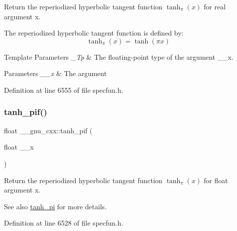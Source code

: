 Return the reperiodized hyperbolic tangent function $ \tanh_\pi(x) $ for real argument {\ttfamily x}.

The reperiodized hyperbolic tangent function is defined by\+: \[ \tanh_\pi(x) = \tanh(\pi x) \]


\begin{DoxyTemplParams}{Template Parameters}
{\em \+\_\+\+Tp} & The floating-\/point type of the argument {\ttfamily \+\_\+\+\_\+x}. \\
\hline
\end{DoxyTemplParams}

\begin{DoxyParams}{Parameters}
{\em \+\_\+\+\_\+x} & The argument \\
\hline
\end{DoxyParams}


Definition at line 6555 of file specfun.\+h.

\mbox{\label{group__mathsf__gnu_gab6cbfb582127f997ad9a198903d08889}} 
\subsubsection{\texorpdfstring{tanh\+\_\+pif()}{tanh\_pif()}}
{\footnotesize\ttfamily float \+\_\+\+\_\+gnu\+\_\+cxx\+::tanh\+\_\+pif (\begin{DoxyParamCaption}\item[{float}]{\+\_\+\+\_\+x }\end{DoxyParamCaption})\hspace{0.3cm}{\ttfamily [inline]}}

Return the reperiodized hyperbolic tangent function $ \tanh_\pi(x) $ for {\ttfamily float} argument {\ttfamily x}.

\begin{DoxySeeAlso}{See also}
\hyperlink{group__mathsf__gnu_ga8729ffd5acf3266315e9dac1b5a9b3a6}{tanh\+\_\+pi} for more details. 
\end{DoxySeeAlso}


Definition at line 6528 of file specfun.\+h.

\mbox{\label{group__mathsf__gnu_ga4bc71ee5cf3df2ba35e6504027e5c6c6}} 
